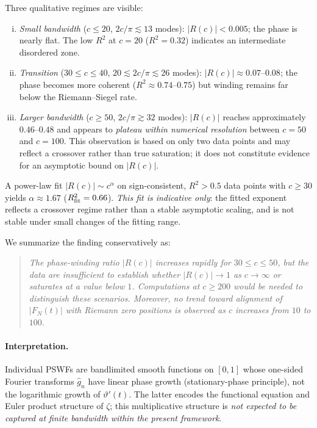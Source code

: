 \documentclass[12pt,a4paper]{amsart}
\theoremstyle{definition}
\begin{document}
Three qualitative regimes are visible:
\begin{enumerate}[(i)]
\item \emph{Small bandwidth} ($c \leq 20$, $2c/\pi \lesssim 13$
modes): $|R(c)| < 0.005$; the phase is nearly flat. The low
$R^2$ at $c = 20$ ($R^2 = 0.32$) indicates an intermediate
disordered zone.
\item \emph{Transition} ($30 \leq c \leq 40$,
$20 \lesssim 2c/\pi \lesssim 26$ modes): $|R(c)| \approx
0.07$--$0.08$; the phase becomes more coherent ($R^2 \approx
0.74$--$0.75$) but winding remains far below the
Riemann--Siegel rate.
\item \emph{Larger bandwidth} ($c \geq 50$, $2c/\pi \gtrsim 32$
modes): $|R(c)|$ reaches approximately $0.46$--$0.48$ and
appears to \emph{plateau within numerical resolution} between
$c = 50$ and $c = 100$. This observation is based on only two
data points and may reflect a crossover rather than true
saturation; it does not constitute evidence for an asymptotic
bound on $|R(c)|$.
\end{enumerate}

A power-law fit $|R(c)| \sim c^\alpha$ on sign-consistent,
$R^2 > 0.5$ data points with $c \geq 30$ yields
$\alpha \approx 1.67$ ($R^2_{\rm fit} = 0.66$).
\emph{This fit is indicative only}: the fitted exponent reflects
a crossover regime rather than a stable asymptotic scaling, and
is not stable under small changes of the fitting range.

We summarize the finding conservatively as:

\begin{quote}
\emph{The phase-winding ratio $|R(c)|$ increases rapidly for
$30 \leq c \leq 50$, but the data are insufficient to establish
whether $|R(c)| \to 1$ as $c \to \infty$ or saturates at a
value below $1$. Computations at $c \geq 200$ would be needed
to distinguish these scenarios. Moreover, no trend toward
alignment of $|F_N(t)|$ with Riemann zero positions is observed
as $c$ increases from $10$ to $100$.}
\end{quote}

\paragraph{Interpretation.}
Individual PSWFs are bandlimited smooth functions on $[0,1]$
whose one-sided Fourier transforms $\widehat{g}_n$ have linear
phase growth (stationary-phase principle), not the logarithmic
growth of $\vartheta'(t)$. The latter encodes the functional
equation and Euler product structure of $\zeta$; this
multiplicative structure is \emph{not expected to be captured
at finite bandwidth within the present framework}.
\end{document}
